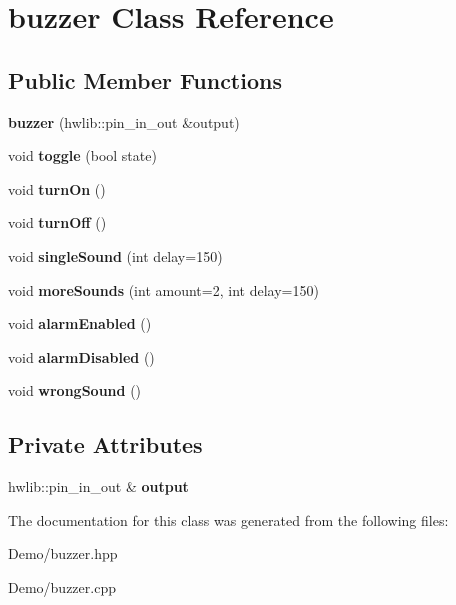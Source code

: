 \hypertarget{classbuzzer}{}\section{buzzer Class Reference}
\label{classbuzzer}
\subsection*{Public Member Functions}
\begin{DoxyCompactItemize}
\item 
\mbox{\label{classbuzzer_abf45c3237132613a00616846fecb4081}} 
{\bfseries buzzer} (hwlib\+::pin\+\_\+in\+\_\+out \&output)
\item 
\mbox{\label{classbuzzer_af2493e3477ffa539a1b574a1012a1f03}} 
void {\bfseries toggle} (bool state)
\item 
\mbox{\label{classbuzzer_abc36c8c7c584fec77bef21d137b31091}} 
void {\bfseries turn\+On} ()
\item 
\mbox{\label{classbuzzer_ada8cc63904ba88d9472d7fd9c1b6a1ae}} 
void {\bfseries turn\+Off} ()
\item 
\mbox{\label{classbuzzer_ad3d0bdf3e4da0da5afd51593e6111856}} 
void {\bfseries single\+Sound} (int delay=150)
\item 
\mbox{\label{classbuzzer_ac78ecdc689862aad0aefa52f0b706a59}} 
void {\bfseries more\+Sounds} (int amount=2, int delay=150)
\item 
\mbox{\label{classbuzzer_a8ec016564faef59c3a68a581fbe08795}} 
void {\bfseries alarm\+Enabled} ()
\item 
\mbox{\label{classbuzzer_ae75aa816f38069dc8aad130240a3b452}} 
void {\bfseries alarm\+Disabled} ()
\item 
\mbox{\label{classbuzzer_a104084dfff836595a8f99446983fe9b5}} 
void {\bfseries wrong\+Sound} ()
\end{DoxyCompactItemize}
\subsection*{Private Attributes}
\begin{DoxyCompactItemize}
\item 
\mbox{\label{classbuzzer_af52c070bff304fe6c9a67b7c1cc25085}} 
hwlib\+::pin\+\_\+in\+\_\+out \& {\bfseries output}
\end{DoxyCompactItemize}


The documentation for this class was generated from the following files\+:\begin{DoxyCompactItemize}
\item 
Demo/buzzer.\+hpp\item 
Demo/buzzer.\+cpp\end{DoxyCompactItemize}
